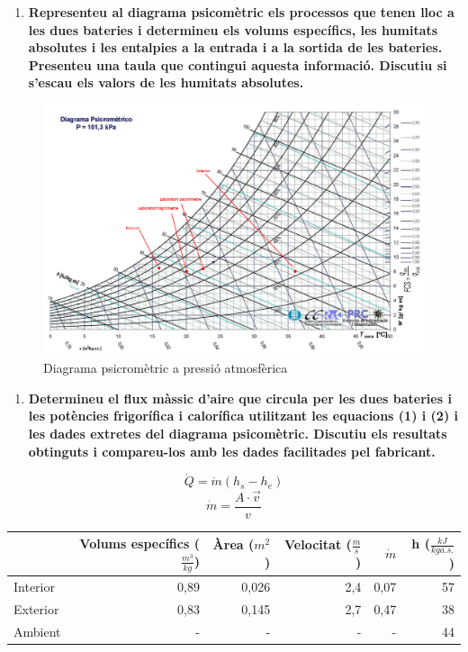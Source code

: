 \documentclass[a4paper]{article}
\newenvironment{questionenum}{%
	\setlist[enumerate]{resume}
	\restartlist{enumerate}
	\newcommand{\question}[1]{
		\begin{enumerate}
			\item\bfseries ##1
		\end{enumerate}
}}{%
}
\begin{document}
\begin{questionenum}
	\question{Representeu al diagrama psicomètric els processos que tenen lloc a les dues bateries i determineu els volums específics, les humitats absolutes i les entalpies a la entrada i a la sortida de les bateries. Presenteu una taula que contingui aquesta informació. Discutiu si s'escau els valors de les humitats absolutes.}
    
    \begin{figure}[H]
        \centering
        \includegraphics[width=\textwidth]{images/psychrometric}
        \caption{Diagrama psicromètric a pressió atmosfèrica}
    \end{figure}
	
	\question{Determineu el flux màssic d'aire que circula per les dues bateries i les potències frigorífica i calorífica utilitzant les equacions (1) i (2) i les dades extretes del diagrama psicomètric. Discutiu els resultats obtinguts i compareu-los amb les dades facilitades pel fabricant.}
    
    $$
    \dot{Q} = \dot{m} (h_s - h_e)
    $$
    $$
    \dot{m} = \frac{A·\vec{v}}{v}
    $$
	
    \begin{table}[H]
        \centering
        \begin{tabular}{l|rrrrr}
            & Volums específics ($\frac{m^3}{kg}$) & Àrea ($m^2$) & Velocitat ($\frac{m}{s}$) & $\dot{m}$ & h ($\frac{kJ}{kg a.s.}$) \\
            \hline
            Interior & 0,89 & 0,026 & 2,4 & 0,07 & 57 \\
            Exterior & 0,83 & 0,145 & 2,7 & 0,47 & 38 \\
            Ambient  & - & - & - & - & 44 
        \end{tabular}
    \end{table}
    

\end{questionenum}
\end{document}
